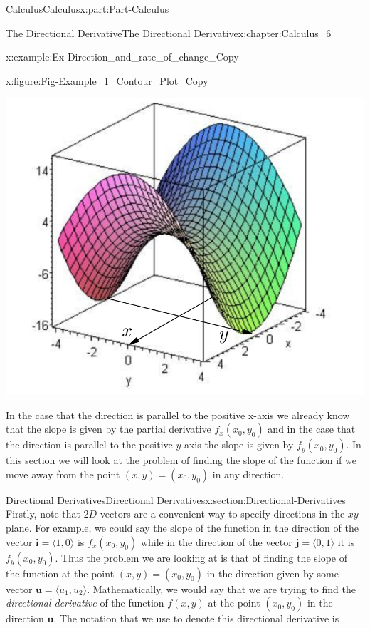 \documentclass[oneside,10pt,]{book}
\numberwithin{equation}{section}
\newcommand{\bm}[1]{\boldsymbol{#1}}
\begin{document}
\begin{partptx}{Calculus}{}{Calculus}{}{}{x:part:Part-Calculus}
\begin{chapterptx}{The Directional Derivative}{}{The Directional Derivative}{}{}{x:chapter:Calculus_6}
\begin{introduction}{}
\begin{example}{}{x:example:Ex-Direction_and_rate_of_change_Copy}
\begin{figureptx}{}{x:figure:Fig-Example_1_Contour_Plot_Copy}{}
\begin{image}{0.15}{0.7}{0.15}
\includegraphics[width=\linewidth]{./Calculus/Images/6/Ex1_Contour_Plot_Fig_1.png}
\end{image}%
\tcblower
\end{figureptx}%
\end{example}
In the case that the direction is parallel to the positive x-axis we already know that the slope is given by the partial derivative \(f_x(x_0,y_0)\) and in the case that the direction is parallel to the positive \(y\)-axis the slope is given by \(f_y(x_0,y_0)\). In this section we will look at the problem of finding the slope of the function if we move away from the point \((x,y) = (x_0,y_0)\) in any direction.%
\end{introduction}%
%
%
\typeout{************************************************}
\typeout{************************************************}
%
\begin{sectionptx}{Directional Derivatives}{}{Directional Derivatives}{}{}{x:section:Directional-Derivatives}
Firstly, note that \(2D\) vectors are a convenient way to specify directions in the \(xy\)-plane. For example, we could say the slope of the function in the direction of the vector \(\bm{i} = \langle 1, 0 \rangle\) is \(f_x(x_0,y_0)\) while in the direction of the vector \(\bm{j} = \langle 0,1 \rangle\) it is \(f_y(x_0,y_0)\). Thus the problem we are looking at is that of finding the slope of the function at the point \((x,y) = (x_0,y_0)\) in the direction given by some vector \(\bm{u} = \langle u_1, u_2 \rangle\). Mathematically, we would say that we are trying to find the \emph{directional derivative} of the function \(f(x,y)\) at the point \((x_0,y_0)\) in the direction \(\bm{u}\). The notation that we use to denote this directional derivative is%

\end{sectionptx}
\end{chapterptx}
\end{partptx}
\end{document}
